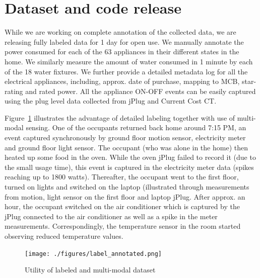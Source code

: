 \documentclass[10pt]{sensys-proc}
\newcommand{\figref}[1]{Figure~\ref{#1}}
\begin{document}
\vspace{-1mm}
\section{Dataset and code release}
While we are working on complete annotation of the collected data, we are releasing fully labeled data for 1 day for open use. %
We manually annotate the power consumed for each of the 63 appliances in their different states in the home. We similarly measure the amount of water consumed in 1 minute by each of the 18 water fixtures. We further provide a detailed metadata log for all the electrical appliances, including, approx. date of purchase, mapping to MCB, star-rating and rated power. All the appliance ON-OFF events can be easily captured using the plug level data collected from jPlug and Current Cost CT. 

\figref{fig:labeled} illustrates the advantage of detailed labeling together with use of multi-modal sensing. One of the occupants returned back home around 7:15 PM, an event captured synchronously by ground floor motion sensor, electricity meter and ground floor light sensor. The occupant (who was alone in the home) then heated up some food in the oven. While the oven jPlug failed to record it (due to the small usage time), this event is captured in the electricity meter data (spikes reaching up to 1800 watts). Thereafter, the occupant went to the first floor, turned on lights and switched on the laptop (illustrated through measurements from motion, light sensor on the first floor and laptop jPlug. After approx. an hour, the occupant switched on the air conditioner which is captured by the jPlug connected to the air conditioner as well as a spike in the meter measurements. Correspondingly, the temperature sensor in the room started observing reduced temperature values. 
 

\begin{figure} 
    \centering\texttt{[image: ./figures/label\_annotated.png]}
	\vspace{-2mm}    
    \caption{Utility of labeled and multi-modal dataset} 
    \vspace{-3mm}  
    \label{fig:labeled}
\end{figure}
\end{document}
